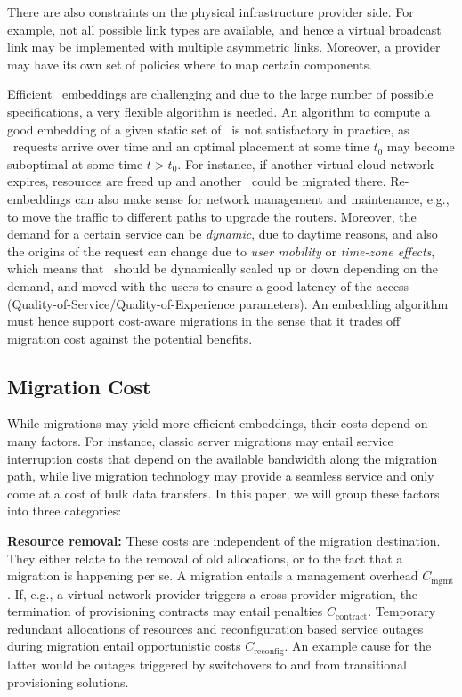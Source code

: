 \documentclass[conference,10pt]{IEEEtran}
\newcommand{\CloudNet}{\text{CloudNet}}
\newcommand{\CloudNets}{\text{CloudNets}}
\newcommand{\mrm}{\mathrm}
\begin{document}
There are also constraints on the physical infrastructure provider
side. For example, not all possible link types are available, and
hence a virtual broadcast link may be implemented with multiple
asymmetric links. Moreover, a provider may have its own set of
policies where to map certain components.

Efficient \CloudNet\ embeddings are challenging and due to the large
number of possible specifications, a very flexible algorithm is
needed.
An algorithm to compute a good embedding of a given static set of
\CloudNets\ is not satisfactory in practice, as \CloudNet\ requests
arrive over time and an optimal placement at some time $t_0$ may
become suboptimal at some time $t>t_0$. For instance, if another
virtual cloud network expires, resources are freed up and another
\CloudNet\ could be migrated there. Re-embeddings can also make
sense for network management and maintenance, e.g., to move the
traffic to different paths to upgrade the routers. Moreover, the
demand for a certain service can be \emph{dynamic}, due to daytime
reasons, and also the origins of the request can change due to
\emph{user mobility} or \emph{time-zone effects}, which means that
\CloudNets\ should be dynamically scaled up or down depending on the
demand, and moved with the users to ensure a good latency of the
access (Quality-of-Service/Quality-of-Experience parameters). An
embedding algorithm must hence support cost-aware migrations in the
sense that it trades off migration cost against the potential
benefits.


\subsection{Migration Cost}\label{sec:map:cost}

While migrations may yield more efficient embeddings, their costs depend on many factors. For instance, classic server migrations may entail service interruption costs that depend on the available bandwidth along the migration path, while live migration technology may provide a seamless service and only come at a cost of bulk data transfers. In this paper, we will group these factors into three categories:

\noindent\textbf{Resource removal:} These costs are independent of the migration destination. They either relate to the removal of old allocations, or to the fact that a migration is happening per se. A migration entails a management overhead $C_{\mrm{mgmt}}$. If, e.g., a virtual network provider triggers a cross-provider migration, the termination of provisioning contracts may entail penalties $C_{\mrm{contract}}$.
		Temporary redundant allocations of resources and reconfiguration based service outages during migration entail opportunistic costs $C_{\mrm{reconfig}}$.
		An example cause for the latter would be outages triggered by switchovers to and from transitional provisioning solutions.
\end{document}
